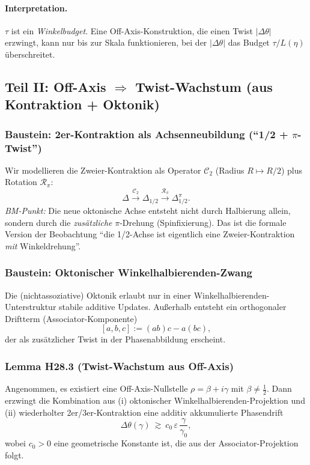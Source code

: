 \paragraph{Interpretation.}
$\tau$ ist ein \emph{Winkelbudget}. Eine Off-Axis-Konstruktion, die einen Twist $|\Delta\theta|$ erzwingt, kann nur bis zur
Skala funktionieren, bei der $|\Delta\theta|$ das Budget $\tau/L(\eta)$ \"uberschreitet.

\subsection{Teil II: Off-Axis $\Rightarrow$ Twist-Wachstum (aus Kontraktion + Oktonik)}

\subsubsection{Baustein: 2er-Kontraktion als Achsenneubildung (``1/2 + $\pi$-Twist'')}
Wir modellieren die Zweier-Kontraktion als Operator $\mathcal C_2$ (Radius $R\mapsto R/2$) plus Rotation $\mathcal R_\pi$:
\[
\Delta \xrightarrow{\mathcal C_2} \Delta_{1/2} \xrightarrow{\mathcal R_\pi} \Delta_{1/2}^\pi.
\]
\emph{BM-Punkt:} Die neue oktonische Achse entsteht nicht durch Halbierung allein, sondern durch die \emph{zus\"atzliche}
$\pi$-Drehung (Spinfixierung). Das ist die formale Version der Beobachtung
``die 1/2-Achse ist eigentlich eine Zweier-Kontraktion \emph{mit} Winkeldrehung''.

\subsubsection{Baustein: Oktonischer Winkelhalbierenden-Zwang}
Die (nichtassoziative) Oktonik erlaubt nur in einer Winkelhalbierenden-Unterstruktur stabile additive Updates.
Au\ss erhalb entsteht ein orthogonaler Driftterm (Associator-Komponente)
\[
[a,b,c] := (ab)c-a(bc),
\]
der als zus\"atzlicher Twist in der Phasenabbildung erscheint.

\subsubsection{Lemma H28.3 (Twist-Wachstum aus Off-Axis)}
\begin{lemma}
Angenommen, es existiert eine Off-Axis-Nullstelle $\rho=\beta+i\gamma$ mit $\beta\neq \tfrac12$.
Dann erzwingt die Kombination aus (i) oktonischer Winkelhalbierenden-Projektion und (ii) wiederholter 2er/3er-Kontraktion
eine additiv akkumulierte Phasendrift
\[
\Delta\theta(\gamma)\ \gtrsim\ c_0\,\varepsilon\,\frac{\gamma}{\gamma_0},
\]
wobei $c_0>0$ eine geometrische Konstante ist, die aus der Associator-Projektion folgt.
\end{lemma}

